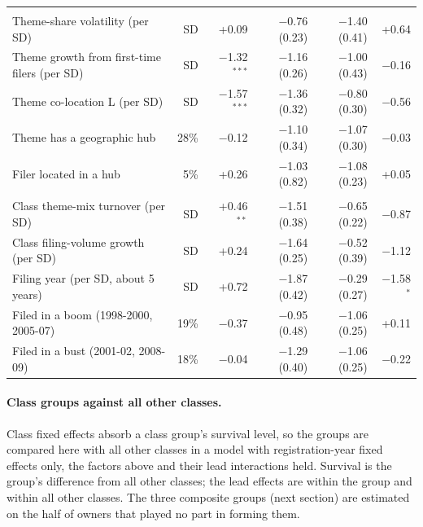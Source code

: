 {\begin{longtable}{>{\raggedright\arraybackslash}p{4.9cm}rrrrr}
\addlinespace\multicolumn{6}{l}{\emph{The theme and its geography}} \\
Theme-share volatility (per SD) & SD & +0.09 & $-$0.76 (0.23) & $-$1.40 (0.41) & +0.64 \\
Theme growth from first-time filers (per SD) & SD & $-$1.32$^{***}$ & $-$1.16 (0.26) & $-$1.00 (0.43) & $-$0.16 \\
Theme co-location L (per SD) & SD & $-$1.57$^{***}$ & $-$1.36 (0.32) & $-$0.80 (0.30) & $-$0.56 \\
Theme has a geographic hub & 28\% & $-$0.12 & $-$1.10 (0.34) & $-$1.07 (0.30) & $-$0.03 \\
Filer located in a hub & 5\% & +0.26 & $-$1.03 (0.82) & $-$1.08 (0.23) & +0.05 \\
\addlinespace\multicolumn{6}{l}{\emph{The class and the year (boom and bust against years that are neither)}} \\
Class theme-mix turnover (per SD) & SD & +0.46$^{**}$ & $-$1.51 (0.38) & $-$0.65 (0.22) & $-$0.87 \\
Class filing-volume growth (per SD) & SD & +0.24 & $-$1.64 (0.25) & $-$0.52 (0.39) & $-$1.12 \\
Filing year (per SD, about 5 years) & SD & +0.72 & $-$1.87 (0.42) & $-$0.29 (0.27) & $-$1.58$^{*}$ \\
Filed in a boom (1998-2000, 2005-07) & 19\% & $-$0.37 & $-$0.95 (0.48) & $-$1.06 (0.25) & +0.11 \\
Filed in a bust (2001-02, 2008-09) & 18\% & $-$0.04 & $-$1.29 (0.40) & $-$1.06 (0.25) & $-$0.22 \\
\bottomrule\end{longtable}}
\paragraph{Class groups against all other classes.} Class fixed effects absorb a class group's survival level, so the groups are compared here with all other classes in a model with registration-year fixed effects only, the factors above and their lead interactions held. Survival is the group's difference from all other classes; the lead effects are within the group and within all other classes. The three composite groups (next section) are estimated on the half of owners that played no part in forming them.

